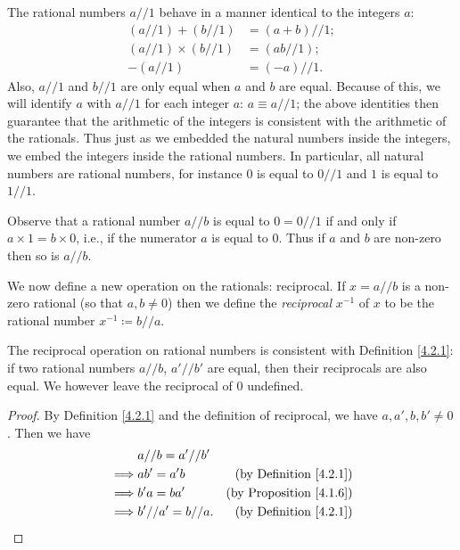 \begin{note}
    The rational numbers \(a // 1\) behave in a manner identical to the integers \(a\):
    \begin{align*}
        (a // 1) + (b // 1)      & = (a + b) // 1; \\
        (a // 1) \times (b // 1) & = (ab // 1);    \\
        -(a // 1)                & = (-a) // 1.
    \end{align*}
    Also, \(a // 1\) and \(b // 1\) are only equal when \(a\) and \(b\) are equal.
    Because of this, we will identify \(a\) with \(a // 1\) for each integer \(a\): \(a \equiv a // 1\);
    the above identities then guarantee that the arithmetic of the integers is consistent with the arithmetic of the rationals.
    Thus just as we embedded the natural numbers inside the integers, we embed the integers inside the rational numbers.
    In particular, all natural numbers are rational numbers, for instance \(0\) is equal to \(0 // 1\) and \(1\) is equal to \(1 // 1\).
\end{note}

\begin{note}
    Observe that a rational number \(a // b\) is equal to \(0 = 0 // 1\) if and only if \(a \times 1 = b \times 0\), i.e., if the numerator \(a\) is equal to \(0\).
    Thus if \(a\) and \(b\) are non-zero then so is \(a // b\).
\end{note}

\begin{note}
    We now define a new operation on the rationals: reciprocal.
    If \(x = a // b\) is a non-zero rational (so that \(a, b \neq 0\)) then we define the \emph{reciprocal} \(x^{-1}\) of \(x\) to be the rational number \(x^{-1} \coloneqq b // a\).
\end{note}

\begin{additional corollary}\label{ac 4.2.2}
The reciprocal operation on rational numbers is consistent with Definition \ref{4.2.1}:
if two rational numbers \(a // b\), \(a' // b'\) are equal, then their reciprocals are also equal.
We however leave the reciprocal of \(0\) undefined.
\end{additional corollary}

\begin{proof}
    By Definition \ref{4.2.1} and the definition of reciprocal, we have \(a, a', b, b' \neq 0\).
    Then we have
    \begin{align*}
                 & a // b = a' // b'                                        \\
        \implies & ab' = a'b          & \text{(by Definition \ref{4.2.1})}  \\
        \implies & b'a = ba'          & \text{(by Proposition \ref{4.1.6})} \\
        \implies & b' // a' = b // a. & \text{(by Definition \ref{4.2.1})}
    \end{align*}
\end{proof}

